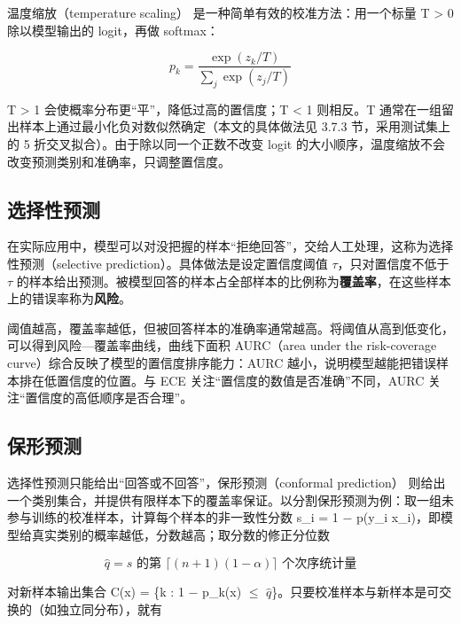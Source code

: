 温度缩放（temperature scaling）\cite{ref22} 是一种简单有效的校准方法：用一个标量 T \textgreater{} 0 除以模型输出的 logit，再做 softmax：

\begin{equation}p_k=\frac{\exp(z_k/T)}{\sum_j\exp(z_j/T)}\tag{2-13}\label{eq:2-13}\end{equation}

T \textgreater{} 1 会使概率分布更``平''，降低过高的置信度；T \textless{} 1 则相反。T 通常在一组留出样本上通过最小化负对数似然确定（本文的具体做法见 3.7.3 节，采用测试集上的 5 折交叉拟合）。由于除以同一个正数不改变 logit 的大小顺序，温度缩放不会改变预测类别和准确率，只调整置信度。

\FloatBarrier\subsection{选择性预测}

在实际应用中，模型可以对没把握的样本``拒绝回答''，交给人工处理，这称为选择性预测（selective prediction）\cite{ref23,ref30}。具体做法是设定置信度阈值 \(\tau\)，只对置信度不低于 \(\tau\) 的样本给出预测。被模型回答的样本占全部样本的比例称为\textbf{覆盖率}，在这些样本上的错误率称为\textbf{风险}。

阈值越高，覆盖率越低，但被回答样本的准确率通常越高。将阈值从高到低变化，可以得到风险---覆盖率曲线，曲线下面积 AURC（area under the risk-coverage curve）综合反映了模型的置信度排序能力：AURC 越小，说明模型越能把错误样本排在低置信度的位置。与 ECE 关注``置信度的数值是否准确''不同，AURC 关注``置信度的高低顺序是否合理''。

\FloatBarrier\subsection{保形预测}

选择性预测只能给出``回答或不回答''，保形预测（conformal prediction）\cite{ref31,ref32} 则给出一个类别集合，并提供有限样本下的覆盖率保证。以分割保形预测为例：取一组未参与训练的校准样本，计算每个样本的非一致性分数 s\_i = 1 \(-\) p(y\_i \textbar{} x\_i)，即模型给真实类别的概率越低，分数越高；取分数的修正分位数

\begin{equation}\hat q=s\text{ 的第 }\lceil(n+1)(1-\alpha)\rceil\text{ 个次序统计量}\tag{2-14}\label{eq:2-14}\end{equation}

对新样本输出集合 C(x) = \{k : 1 \(-\) p\_k(x) \(\le\) \(\hat q\)\}。只要校准样本与新样本是可交换的（如独立同分布），就有

